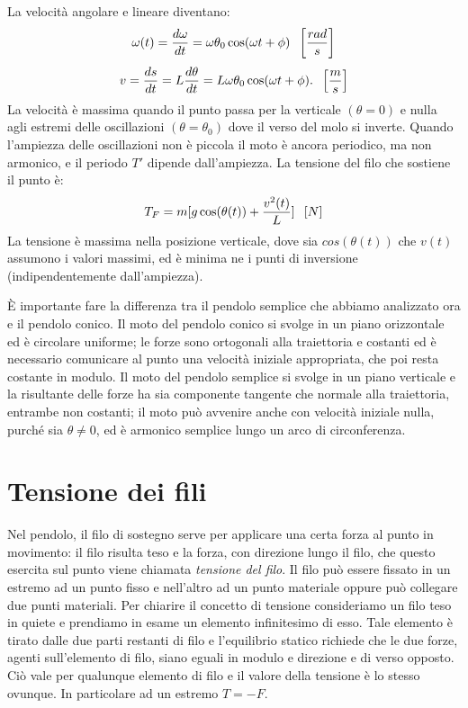 \documentclass[class=book, crop=false, oneside, 12pt]{standalone}
\begin{document}
La velocità angolare e lineare diventano:
\begin{equation}
    \omega (t) = \frac{d \omega}{dt} = \omega \theta_0 \cos (\omega t + \phi) \hspace{0.2cm} \left[\frac{rad}{s}\right]
\end{equation}
\begin{equation}
    v = \frac{d s}{dt} = L \frac{d \theta}{ dt} = L \omega \theta_0 \cos (\omega t +\phi). \hspace{0.2cm} \left[\frac{m}{s}\right]
\end{equation}
La velocità è massima quando il punto passa per la verticale \((\theta = 0)\) e nulla agli estremi delle oscillazioni \((\theta= \theta_0)\) dove il verso del molo si inverte.\newline
Quando l'ampiezza delle oscillazioni non è piccola il moto è ancora periodico, ma non armonico, e il periodo \(T'\) dipende dall'ampiezza.\newline
La tensione del filo che sostiene il punto è:
\begin{equation}
    T_F = m [ g \cos ( \theta(t) ) + \frac{v^2(t)}{L} ] \hspace{0.2cm} \left[N\right]
\end{equation}
La tensione è massima nella posizione verticale, dove sia \(cos  (\theta (t))\) che \(v(t)\) assumono i valori massimi, ed è minima ne i punti di inversione (indipendentemente dall'ampiezza). 

È importante fare la differenza tra il pendolo semplice che abbiamo analizzato ora e il pendolo conico.
Il moto del pendolo conico si svolge in un piano orizzontale ed è circolare uniforme; le forze sono ortogonali alla traiettoria e costanti ed è necessario comunicare al punto una velocità iniziale appropriata, che poi resta costante in modulo. 
Il moto del pendolo semplice si svolge in un piano verticale e la risultante delle forze ha sia componente tangente che normale alla traiettoria, entrambe non costanti; il moto può avvenire anche con velocità iniziale nulla, purché sia \(\theta \neq 0\), ed è armonico semplice lungo un arco di circonferenza.

\section{Tensione dei fili}

Nel pendolo, il filo di sostegno serve per applicare una certa forza al punto in movimento: il filo risulta teso e la forza, con direzione lungo il filo, che questo esercita sul punto viene chiamata \emph{tensione del filo}. Il filo può essere fissato in un estremo ad un punto fisso e nell'altro ad un punto materiale oppure può collegare due punti materiali.\newline
Per chiarire il concetto di tensione consideriamo un filo teso in quiete e prendiamo in esame un elemento infinitesimo di esso. Tale elemento è tirato dalle due parti restanti di filo e l'equilibrio statico richiede che le due forze, agenti sull'elemento di filo, siano eguali in modulo e direzione e di verso opposto.\newline
Ciò vale per qualunque elemento di filo e il valore della tensione è lo stesso ovunque. In particolare ad un estremo \(T = -F\).
\end{document}
